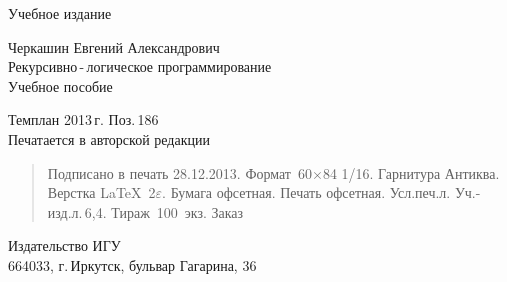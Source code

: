 \documentclass[12pt, openany, twoside]{book} %
\begin{document}
\newpage
\thispagestyle{empty}
\hbox{}\hfill{}Учебное издание
\vfill
\begin{center}
Черкашин Евгений Александрович\\{}
\vspace{2em}
{Рекурсивно\,-\,логическое программирование}\\
{Учебное пособие}
\vfill{}


Темплан 2013\,{}г. Поз.\,{}186\\[2em]
Печатается в авторской редакции\\[1em]

\end{center}
\begin{quote}
\noindent Подписано в печать 28.12.2013.
Формат~60$\times$84 1/16. Гарнитура Антиква.
Верстка \LaTeX~2$\varepsilon$.
Бумага офсетная. Печать офсетная. Усл.печ.л.
Уч.-изд.л.\,{}6,4. Тираж~100~экз. Заказ
\end{quote}
\begin{center}
Издательство ИГУ\\{}
664033, г.\,{}Иркутск, бульвар Гагарина, 36
\end{center}
\end{document}

